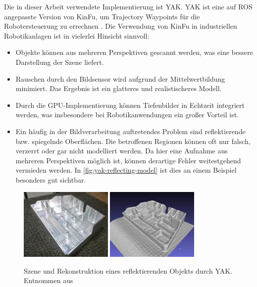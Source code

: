 Die in dieser Arbeit verwendete Implementierung ist \ac{YAK}.
\ac{YAK} ist eine auf \ac{ROS} angepasste Version von \ac{KinFu}, um Trajectory Waypoints für die Robotersteuerung zu errechnen \cite{schornak2019yak}.
Die Verwendung von \ac{KinFu} in industriellen Robotikanlagen ist in vielerlei Hinsicht sinnvoll:
\begin{itemize}
\item Objekte können aus mehreren Perspektiven gescannt werden, was eine bessere Darstellung der Szene liefert.
\item Rauschen durch den Bildsensor wird aufgrund der Mittelwertbildung minimiert.
Das Ergebnis ist ein glatteres und realistischeres Modell.
\item Durch die GPU-Implementierung können Tiefenbilder in Echtzeit integriert werden, was insbesondere bei Robotikanwendungen ein großer Vorteil ist.
\item Ein häufig in der Bildverarbeitung auftretendes Problem sind reflektierende bzw. spiegelnde Oberflächen.
Die betroffenen Regionen können oft nur falsch, verzerrt oder gar nicht modelliert werden.
Da hier eine Aufnahme aus mehreren Perspektiven möglich ist, können derartige Fehler weitestgehend vermieden werden. In \autoref{fig:yak-reflecting-model} ist dies an einem Beispiel besonders gut sichtbar.
\end{itemize}

\begin{figure}[H]
	\centering
	\includegraphics[width=0.4\textwidth]{images/yak-reflecting-scene.jpg}
	\includegraphics[width=0.4\textwidth]{images/yak-reflecting-reconstruction.png}
	\caption{Szene und Rekonstruktion eines reflektierenden Objekts durch \ac{YAK}. Entnommen aus \cite{schornak2019yak}}
	\label{fig:yak-reflecting-model}
\end{figure}

